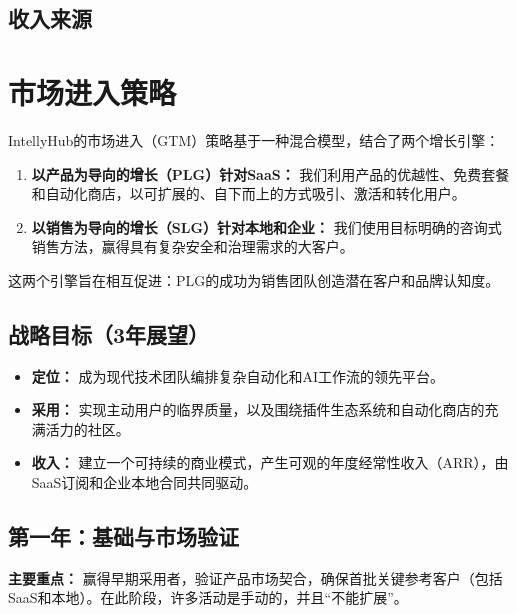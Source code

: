 \documentclass[11pt, a4paper, oneside]{article}
\begin{document}
\subsection{收入来源}



\section{市场进入策略}

IntellyHub的市场进入（GTM）策略基于一种混合模型，结合了两个增长引擎：
\begin{enumerate}
    \item \textbf{以产品为导向的增长（PLG）针对SaaS：} 我们利用产品的优越性、免费套餐和自动化商店，以可扩展的、自下而上的方式吸引、激活和转化用户。
    \item \textbf{以销售为导向的增长（SLG）针对本地和企业：} 我们使用目标明确的咨询式销售方法，赢得具有复杂安全和治理需求的大客户。
\end{enumerate}
这两个引擎旨在相互促进：PLG的成功为销售团队创造潜在客户和品牌认知度。

\subsection{战略目标（3年展望）}
\begin{itemize}
    \item \textbf{定位：} 成为现代技术团队编排复杂自动化和AI工作流的领先平台。
    \item \textbf{采用：} 实现主动用户的临界质量，以及围绕插件生态系统和自动化商店的充满活力的社区。
    \item \textbf{收入：} 建立一个可持续的商业模式，产生可观的年度经常性收入（ARR），由SaaS订阅和企业本地合同共同驱动。
\end{itemize}

\newpage
\subsection{第一年：基础与市场验证}
\textbf{主要重点：} 赢得早期采用者，验证产品市场契合，确保首批关键参考客户（包括SaaS和本地）。在此阶段，许多活动是手动的，并且“不能扩展”。
\end{document}
